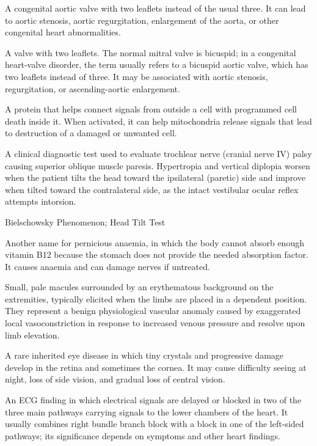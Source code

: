  A congenital aortic valve with two leaflets instead of the usual three. It can lead to
aortic stenosis, aortic regurgitation, enlargement of the aorta, or other congenital heart abnormalities.

 A valve with two leaflets. The normal mitral valve
is bicuspid; in a congenital heart-valve disorder, the term usually refers to
a bicuspid aortic valve, which has two leaflets instead of three. It may be
associated with aortic stenosis, regurgitation, or ascending-aortic enlargement.

 A protein that helps connect signals from outside a cell with programmed cell death inside it. When activated, it can help mitochondria release signals that lead to destruction of a damaged or unwanted cell.

 A clinical diagnostic test used to evaluate trochlear nerve (cranial nerve IV) palsy causing superior oblique muscle paresis. Hypertropia and vertical diplopia worsen when the patient tilts the head toward the ipsilateral (paretic) side and improve when tilted toward the contralateral side, as the intact vestibular ocular reflex attempts intorsion.

\synonyms
Bielschowsky Phenomenon; Head Tilt Test

 Another name for pernicious anaemia, in which the body cannot absorb enough vitamin B12 because the stomach does not provide the needed absorption factor. It causes anaemia and can damage nerves if untreated.

 Small, pale macules surrounded by an erythematous background on the extremities, typically elicited when the limbs are placed in a dependent position. They represent a benign physiological vascular anomaly caused by exaggerated local vasoconstriction in response to increased venous pressure and resolve upon limb elevation.

 A rare inherited eye disease in which tiny crystals and progressive damage develop in the retina and sometimes the cornea. It may cause difficulty seeing at night, loss of side vision, and gradual loss of central vision.

 An ECG finding in which electrical signals are delayed or blocked in two of the three main pathways carrying signals to the lower chambers of the heart. It usually combines right bundle branch block with a block in one of the left-sided pathways; its significance depends on symptoms and other heart findings.

